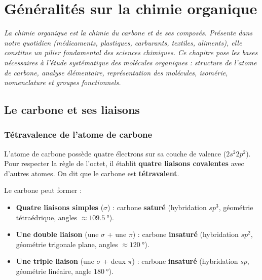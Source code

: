 \chapter{Généralités sur la chimie organique}

\textit{La chimie organique est la chimie du carbone et de ses composés. Présente dans notre quotidien (médicaments, plastiques, carburants, textiles, aliments), elle constitue un pilier fondamental des sciences chimiques. Ce chapitre pose les bases nécessaires à l'étude systématique des molécules organiques : structure de l'atome de carbone, analyse élémentaire, représentation des molécules, isomérie, nomenclature et groupes fonctionnels.}

\section{Le carbone et ses liaisons}

\subsection{Tétravalence de l'atome de carbone}

\begin{definition}
L'atome de carbone possède quatre électrons sur sa couche de valence ($2s^2 2p^2$). Pour respecter la règle de l'octet, il établit \textbf{quatre liaisons covalentes} avec d'autres atomes. On dit que le carbone est \textbf{tétravalent}.
\end{definition}

\begin{propriete}
Le carbone peut former :
\begin{itemize}
    \item \textbf{Quatre liaisons simples} ($\sigma$) : carbone \textbf{saturé} (hybridation $sp^3$, géométrie tétraédrique, angles $\approx \SI{109.5}{\degree}$).
    \item \textbf{Une double liaison} (une $\sigma$ + une $\pi$) : carbone \textbf{insaturé} (hybridation $sp^2$, géométrie trigonale plane, angles $\approx \SI{120}{\degree}$).
    \item \textbf{Une triple liaison} (une $\sigma$ + deux $\pi$) : carbone \textbf{insaturé} (hybridation $sp$, géométrie linéaire, angle $\SI{180}{\degree}$).
\end{itemize}
\end{propriete}

\begin{exemple}
\begin{center}
\begin{illus}
 \qquad
{} \qquad
{}
\end{illus}
\end{center}
\end{exemple}

